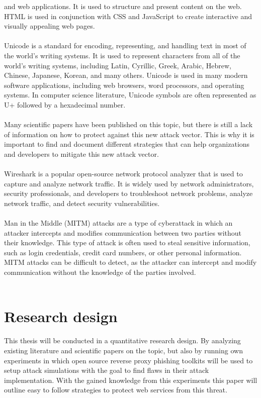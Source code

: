 \documentclass[12pt]{scrbook}
\begin{document}
and web applications. It is used to structure and present content on the web.
HTML is used in conjunction with CSS and JavaScript to create interactive and
visually appealing web pages.\\ \\ Unicode is a standard for encoding,
representing, and handling text in most of the world's writing systems. It is
used to represent characters from all of the world's writing systems, including
Latin, Cyrillic, Greek, Arabic, Hebrew, Chinese, Japanese, Korean, and many
others. Unicode is used in many modern software applications, including web
browsers, word processors, and operating systems. In computer science
literature, Unicode symbols are often represented as U+ followed by a
hexadecimal number. \\ \\ Many scientific papers have been published on this
topic, but there is still a lack of information on how to protect against this
new attack vector. This is why it is important to find and document different
strategies that can help organizations and developers to mitigate this new
attack vector. \\ \\ Wireshark is a popular open-source network protocol
analyzer that is used to capture and analyze network traffic. It is widely used
by network administrators, security professionals, and developers to
troubleshoot network problems, analyze network traffic, and detect security
vulnerabilities. \\ \\ Man in the Middle (MITM) attacks are a type of
cyberattack in which an attacker intercepts and modifies communication between
two parties without their knowledge. This type of attack is often used to steal
sensitive information, such as login credentials, credit card numbers, or other
personal information. MITM attacks can be difficult to detect, as the attacker
can intercept and modify communication without the knowledge of the parties
involved. \\ \\

\section{Research design} This thesis will be conducted in a quantitative
research design. By analyzing existing literature and scientific papers on the
topic, but also by running own experiments in which open source reverse proxy
phishing toolkits will be used to setup attack simulations with the goal to find
flaws in their attack implementation. With the gained knowledge from this
experiments this paper will outline easy to follow strategies to protect web
services from this threat.
\end{document}
